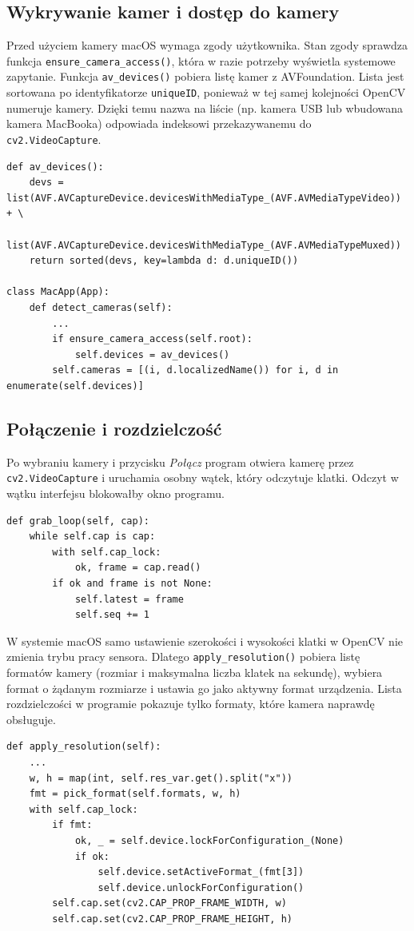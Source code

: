 \subsection{Wykrywanie kamer i dostęp do kamery}
Przed użyciem kamery macOS wymaga zgody użytkownika. Stan zgody sprawdza funkcja
\texttt{ensure\_camera\_access()}, która w razie potrzeby wyświetla systemowe zapytanie. Funkcja
\texttt{av\_devices()} pobiera listę kamer z AVFoundation. Lista jest sortowana po
identyfikatorze \texttt{uniqueID}, ponieważ w tej samej kolejności OpenCV numeruje kamery.
Dzięki temu nazwa na liście (np. kamera USB lub wbudowana kamera MacBooka) odpowiada
indeksowi przekazywanemu do \texttt{cv2.VideoCapture}.
\begin{lstlisting}
def av_devices():
    devs = list(AVF.AVCaptureDevice.devicesWithMediaType_(AVF.AVMediaTypeVideo)) + \
        list(AVF.AVCaptureDevice.devicesWithMediaType_(AVF.AVMediaTypeMuxed))
    return sorted(devs, key=lambda d: d.uniqueID())

class MacApp(App):
    def detect_cameras(self):
        ...
        if ensure_camera_access(self.root):
            self.devices = av_devices()
        self.cameras = [(i, d.localizedName()) for i, d in enumerate(self.devices)]
\end{lstlisting}

\subsection{Połączenie i rozdzielczość}
Po wybraniu kamery i przycisku \emph{Połącz} program otwiera kamerę przez
\texttt{cv2.VideoCapture} i uruchamia osobny wątek, który odczytuje klatki. Odczyt w wątku
interfejsu blokowałby okno programu.
\begin{lstlisting}
def grab_loop(self, cap):
    while self.cap is cap:
        with self.cap_lock:
            ok, frame = cap.read()
        if ok and frame is not None:
            self.latest = frame
            self.seq += 1
\end{lstlisting}
W systemie macOS samo ustawienie szerokości i wysokości klatki w OpenCV nie zmienia trybu pracy
sensora. Dlatego \texttt{apply\_resolution()} pobiera listę formatów kamery (rozmiar i maksymalna
liczba klatek na sekundę), wybiera format o żądanym rozmiarze i ustawia go jako aktywny format
urządzenia. Lista rozdzielczości w programie pokazuje tylko formaty, które kamera naprawdę obsługuje.
\begin{lstlisting}
def apply_resolution(self):
    ...
    w, h = map(int, self.res_var.get().split("x"))
    fmt = pick_format(self.formats, w, h)
    with self.cap_lock:
        if fmt:
            ok, _ = self.device.lockForConfiguration_(None)
            if ok:
                self.device.setActiveFormat_(fmt[3])
                self.device.unlockForConfiguration()
        self.cap.set(cv2.CAP_PROP_FRAME_WIDTH, w)
        self.cap.set(cv2.CAP_PROP_FRAME_HEIGHT, h)
\end{lstlisting}

